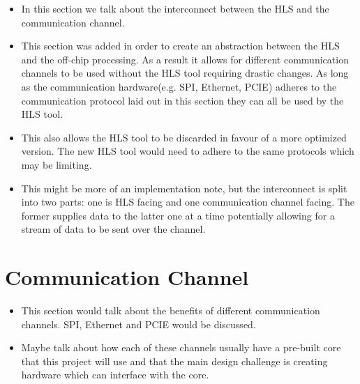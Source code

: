 \begin{itemize}
    \item In this section we talk about the interconnect between the HLS and the communication channel.
    \item This section was added in order to create an abstraction between the HLS and the off-chip processing. As a result it allows for different communication channels to be used without the HLS tool requiring drastic changes. As long as the communication hardware(e.g. SPI, Ethernet, PCIE) adheres to the communication protocol laid out in this section they can all be used by the HLS tool.
    \item This also allows the HLS tool to be discarded in favour of a more optimized version. The new HLS tool would need to adhere to the same protocols which may be limiting.
    \item This might be more of an implementation note, but the interconnect is split into two parts: one is HLS facing and one communication channel facing. The former supplies data to the latter one at a time potentially allowing for a stream of data to be sent over the channel.
\end{itemize}

\section{Communication Channel}

\begin{itemize}
    \item This section would talk about the benefits of different communication channels. SPI, Ethernet and PCIE would be discussed.
    \item Maybe talk about how each of these channels usually have a pre-built core that this project will use and that the main design challenge is creating hardware which can interface with the core.
\end{itemize}